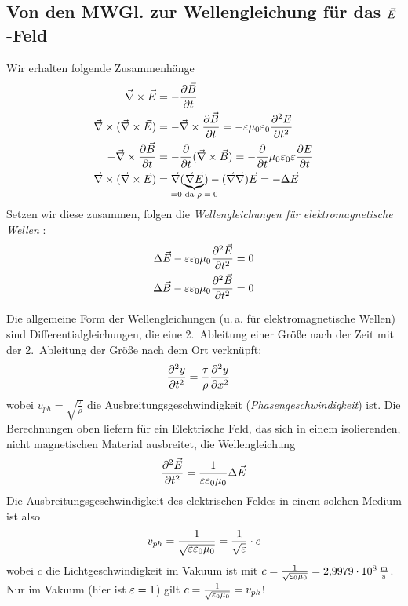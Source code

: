 
\subsection[Wellengleichung]{Von den MWGl. zur Wellengleichung für das $\vecE$-Feld}
Wir erhalten folgende Zusammenhänge
\begin{align*}
  \vecna \times \vecE 
  &=-\dif[\vecB]{t}
  \\
  \vecna \times (\vecna\times\vecE)
  &=-\vecna\times\dif[\vecB]{t}
    =-\eps\muo\epso\diff[E]{t}
  \\
  -\vecna \times \dif[\vecB]{t}
  &= -\dif[]{t}(\vecna\times\vecB)
    = -\dif[]{t}\muo\epso\eps\dif[E]{t}
  \\
  \vecna\times(\vecna\times\vecE)
  &=\vecna(\underbrace{\vecna\vecE}_{\mathclap{=0 \text{ da $\rho=0$}}})
    -(\vecna\vecna)\vecE
    =-\Delta\vecE
\end{align*}
Setzen wir diese zusammen, folgen die
\emph{Wellengleichungen für elektromagnetische Wellen}%
:
\begin{align*}
  \Delta\vecE-\eps\epso\muo\diff[\vecE]{t} &= 0\\
  \Delta\vecB-\eps\epso\muo\diff[\vecB]{t} &= 0
\end{align*}

Die allgemeine Form der Wellengleichungen (u.\,a. für elektromagnetische
Wellen) sind Differentialgleichungen, die eine 2.~Ableitung einer Größe nach der Zeit mit der
2.~Ableitung der Größe nach dem Ort verknüpft: 
\begin{align*}
  \diff[y]{t}&=\frac{\tau}{\rho}\diff[y]{x}
\end{align*}
wobei $v_{ph}=\sqrt{\frac{\tau}{\rho}}$ die Ausbreitungsgeschwindigkeit
(\emph{Phasengeschwindigkeit})%
%
%
ist. 
Die Berechnungen oben liefern für ein Elektrische Feld,
das sich in einem isolierenden, nicht magnetischen Material
ausbreitet, die Wellengleichung
\begin{gather}
  \diff[\vecE]{t} = \frac{1}{\varepsilon\varepsilon_0\mu_0} 
  \Delta \vecE
  \label{elektrWG}
\end{gather}
Die Ausbreitungsgeschwindigkeit des elektrischen Feldes in einem
solchen Medium ist also
\begin{gather*}
  v_{ph} = \frac{1}{\sqrt{\eps\epso\muo}}
  =\frac{1}{\sqrt{\eps}}\cdot c
\end{gather*}
wobei $c$ die Lichtgeschwindigkeit im Vakuum%
 ist mit
$c=\frac{1}{\sqrt{\epso\muo}}=\SI{2.9979e8}{\m\per\s}$.
 Nur im Vakuum (hier ist $\eps = 1$) gilt
$c=\frac{1}{\sqrt{\epso\muo}}=v_{ph}$!

